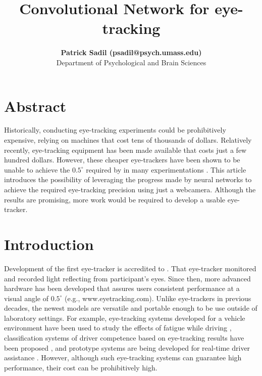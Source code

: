 \documentclass[10pt,letterpaper]{article}
\title{Convolutional Network for eye-tracking}
\author{{\large \bf Patrick Sadil (psadil@psych.umass.edu)} \\
  Department of Psychological and Brain Sciences
}
\begin{document}
\maketitle


\section{Abstract}

Historically, conducting eye-tracking experiments could be prohibitively expensive, relying on machines that cost tens of thousands of dollars. Relatively recently, eye-tracking equipment has been made available that costs just a few hundred dollars. However, these cheaper eye-trackers have been shown to be unable to achieve the $0.5^{\circ}$ required by in many experimentations \cite{zugal2015low}. This article introduces the possibility of leveraging the progress made by neural networks to achieve the required eye-tracking precision using just a webcamera. Although the results are promising, more work would be required to develop a usable eye-tracker.


\section{Introduction}

Development of the first eye-tracker is accredited to . That eye-tracker monitored and recorded light reflecting from participant's eyes. Since then, more advanced hardware has been developed that assures users consistent performance at a visual angle of $0.5^{\circ}$ (e.g., www.eyetracking.com). Unlike eye-trackers in previous decades, the newest models are versatile and portable enough to be use outside of laboratory settings. For example, eye-tracking systems developed for a vehicle environment have been used to study the effects of fatigue while driving \cite{hopstaken2016}, classification systems of driver competence based on eye-tracking results have been proposed \cite{zhang2015classification}, and prototype systems are being developed for real-time driver assistance \cite{ghosh2015real}. However, although such eye-tracking systems can guarantee high performance, their cost can be prohibitively high. 
\end{document}
